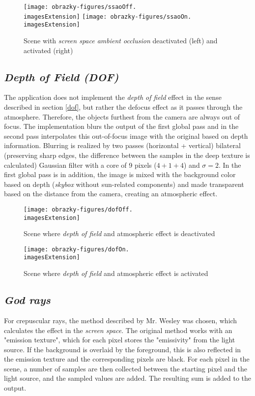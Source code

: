 \begin{figure}[H]
	\texttt{[image: obrazky-figures/ssaoOff.\\imagesExtension]}
	\hfill
	\texttt{[image: obrazky-figures/ssaoOn.\\imagesExtension]}
	\caption{Scene with \textit{screen space ambient occlusion} deactivated (left) and activated (right)}
\end{figure}

\subsection{\textit{Depth of Field (DOF)}}
The application does not implement the \textit{depth of field} effect in the sense described in section \ref{dof}, but rather the defocus effect as it passes through the atmosphere. Therefore, the objects furthest from the camera are always out of focus. The implementation blurs the output of the first global pass and in the second pass interpolates this out-of-focus image with the original based on depth information. Blurring is realized by two passes (horizontal + vertical) bilateral (preserving sharp edges, the difference between the samples in the deep texture is calculated) Gaussian filter with a core of 9 pixels ($4+1+4$) and $\sigma = 2$. In the first global pass is in addition, the image is mixed with the background color based on depth (\textit{skybox} without sun-related components) and made transparent based on the distance from the camera, creating an atmospheric effect.

\begin{figure}[H]
	\centering
	\texttt{[image: obrazky-figures/dofOff.\\imagesExtension]}
	\caption{Scene where \textit{depth of field} and atmospheric effect is deactivated}
\end{figure}

\vfill
	
\begin{figure}[H]
	\texttt{[image: obrazky-figures/dofOn.\\imagesExtension]}
	\caption{Scene where \textit{depth of field} and atmospheric effect is activated}
\end{figure}

\pagebreak
\subsection{\textit{God rays}}
For crepuscular rays, the method described by Mr. Wesley was chosen, which calculates the effect in the \textit{screen space}. The original method works with an "emission texture", which for each pixel stores the "emissivity" from the light source. If the background is overlaid by the foreground, this is also reflected in the emission texture and the corresponding pixels are black. For each pixel in the scene, a number of samples are then collected between the starting pixel and the light source, and the sampled values are added. The resulting sum is added to the output.

